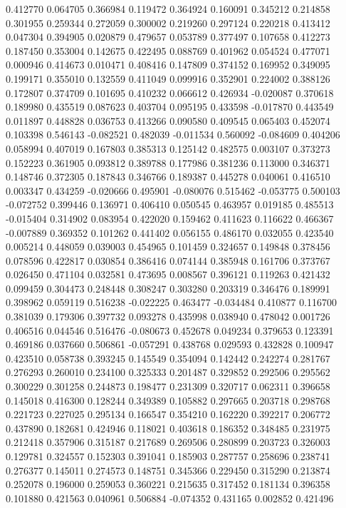 0.412770
0.064705
0.366984
0.119472
0.364924
0.160091
0.345212
0.214858
0.301955
0.259344
0.272059
0.300002
0.219260
0.297124
0.220218
0.413412
0.047304
0.394905
0.020879
0.479657
0.053789
0.377497
0.107658
0.412273
0.187450
0.353004
0.142675
0.422495
0.088769
0.401962
0.054524
0.477071
0.000946
0.414673
0.010471
0.408416
0.147809
0.374152
0.169952
0.349095
0.199171
0.355010
0.132559
0.411049
0.099916
0.352901
0.224002
0.388126
0.172807
0.374709
0.101695
0.410232
0.066612
0.426934
-0.020087
0.370618
0.189980
0.435519
0.087623
0.403704
0.095195
0.433598
-0.017870
0.443549
0.011897
0.448828
0.036753
0.413266
0.090580
0.409545
0.065403
0.452074
0.103398
0.546143
-0.082521
0.482039
-0.011534
0.560092
-0.084609
0.404206
0.058994
0.407019
0.167803
0.385313
0.125142
0.482575
0.003107
0.373273
0.152223
0.361905
0.093812
0.389788
0.177986
0.381236
0.113000
0.346371
0.148746
0.372305
0.187843
0.346766
0.189387
0.445278
0.040061
0.416510
0.003347
0.434259
-0.020666
0.495901
-0.080076
0.515462
-0.053775
0.500103
-0.072752
0.399446
0.136971
0.406410
0.050545
0.463957
0.019185
0.485513
-0.015404
0.314902
0.083954
0.422020
0.159462
0.411623
0.116622
0.466367
-0.007889
0.369352
0.101262
0.441402
0.056155
0.486170
0.032055
0.423540
0.005214
0.448059
0.039003
0.454965
0.101459
0.324657
0.149848
0.378456
0.078596
0.422817
0.030854
0.386416
0.074144
0.385948
0.161706
0.373767
0.026450
0.471104
0.032581
0.473695
0.008567
0.396121
0.119263
0.421432
0.099459
0.304473
0.248448
0.308247
0.303280
0.203319
0.346476
0.189991
0.398962
0.059119
0.516238
-0.022225
0.463477
-0.034484
0.410877
0.116700
0.381039
0.179306
0.397732
0.093278
0.435998
0.038940
0.478042
0.001726
0.406516
0.044546
0.516476
-0.080673
0.452678
0.049234
0.379653
0.123391
0.469186
0.037660
0.506861
-0.057291
0.438768
0.029593
0.432828
0.100947
0.423510
0.058738
0.393245
0.145549
0.354094
0.142442
0.242274
0.281767
0.276293
0.260010
0.234100
0.325333
0.201487
0.329852
0.292506
0.295562
0.300229
0.301258
0.244873
0.198477
0.231309
0.320717
0.062311
0.396658
0.145018
0.416300
0.128244
0.349389
0.105882
0.297665
0.203718
0.298768
0.221723
0.227025
0.295134
0.166547
0.354210
0.162220
0.392217
0.206772
0.437890
0.182681
0.424946
0.118021
0.403618
0.186352
0.348485
0.231975
0.212418
0.357906
0.315187
0.217689
0.269506
0.280899
0.203723
0.326003
0.129781
0.324557
0.152303
0.391041
0.185903
0.287757
0.258696
0.238741
0.276377
0.145011
0.274573
0.148751
0.345366
0.229450
0.315290
0.213874
0.252078
0.196000
0.259053
0.360221
0.215635
0.317452
0.181134
0.396358
0.101880
0.421563
0.040961
0.506884
-0.074352
0.431165
0.002852
0.421496
